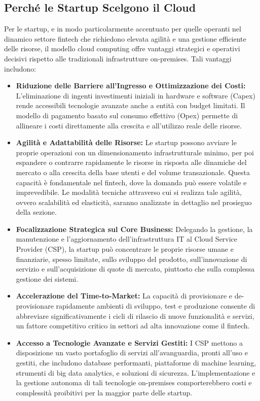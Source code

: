 \subsection{Perché le Startup Scelgono il Cloud}
\label{sec:startup-cloud-choice}

Per le startup, e in modo particolarmente accentuato per quelle operanti nel dinamico settore fintech che richiedono elevata agilità e una gestione efficiente delle risorse, il modello cloud computing offre vantaggi strategici e operativi decisivi rispetto alle tradizionali infrastrutture on-premises. Tali vantaggi includono:

\begin{itemize}
\item \textbf{Riduzione delle Barriere all'Ingresso e Ottimizzazione dei Costi:} L'eliminazione di ingenti investimenti iniziali in hardware e software (Capex) rende accessibili tecnologie avanzate anche a entità con budget limitati. Il modello di pagamento basato sul consumo effettivo (Opex) permette di allineare i costi direttamente alla crescita e all'utilizzo reale delle risorse.
\item \textbf{Agilità e Adattabilità delle Risorse:} Le startup possono avviare le proprie operazioni con un dimensionamento infrastrutturale minimo, per poi espandere o contrarre rapidamente le risorse in risposta alle dinamiche del mercato o alla crescita della base utenti e del volume transazionale. Questa capacità è fondamentale nel fintech, dove la domanda può essere volatile e imprevedibile. Le modalità tecniche attraverso cui si realizza tale agilità, ovvero scalabilità ed elasticità, saranno analizzate in dettaglio nel prosieguo della sezione.
\item \textbf{Focalizzazione Strategica sul Core Business:} Delegando la gestione, la manutenzione e l'aggiornamento dell'infrastruttura IT al Cloud Service Provider (CSP), la startup può concentrare le proprie risorse umane e finanziarie, spesso limitate, sullo sviluppo del prodotto, sull'innovazione di servizio e sull'acquisizione di quote di mercato, piuttosto che sulla complessa gestione dei sistemi.
\item \textbf{Accelerazione del Time-to-Market:} La capacità di provisionare e de-provisionare rapidamente ambienti di sviluppo, test e produzione consente di abbreviare significativamente i cicli di rilascio di nuove funzionalità e servizi, un fattore competitivo critico in settori ad alta innovazione come il fintech.
\item \textbf{Accesso a Tecnologie Avanzate e Servizi Gestiti:} I CSP mettono a disposizione un vasto portafoglio di servizi all'avanguardia, pronti all'uso e gestiti, che includono database performanti, piattaforme di machine learning, strumenti di big data analytics, e soluzioni di sicurezza. L'implementazione e la gestione autonoma di tali tecnologie on-premises comporterebbero costi e complessità proibitivi per la maggior parte delle startup.

\end{itemize}
